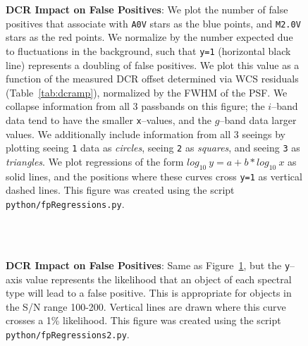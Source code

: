 \documentclass[prd, nofootinbib, floatfix, 11pt, tightenlines, times]{article}
\def\figdir{../figures}
\begin{document}
\begin{figure}[!ht]
  \centering
   \\
   \\
  \caption{{\bf DCR Impact on False Positives}: We plot the number of
    false positives that associate with {\tt A0V} stars as the blue
    points, and {\tt M2.0V} stars as the red points.  We normalize by
    the number expected due to fluctuations in the background, such
    that {\tt y=1} (horizontal black line) represents a doubling of
    false positives.  We plot this value as a function of the measured
    DCR offset determined via WCS residuals (Table~\ref{tab:dcramp}),
    normalized by the FWHM of the PSF.  We collapse information from
    all 3 passbands on this figure; the $i$--band data tend to have
    the smaller {\tt x}--values, and the $g$--band data larger values.
    We additionally include information from all 3 seeings by plotting
    seeing {\tt 1} data as {\it circles}, seeing {\tt 2} as {\it
      squares}, and seeing {\tt 3} as {\it triangles}.  We plot
    regressions of the form $log_{10}~y = a + b * log_{10}~x$ as solid
    lines, and the positions where these curves cross {\tt y=1} as
    vertical dashed lines.  This figure was created using the script
    {\tt python/fpRegressions.py}.}
  \label{fig:fpregress}
\end{figure}

\begin{figure}[!ht]
  \centering
   \\
   \\
  \caption{{\bf DCR Impact on False Positives}: Same as
    Figure~\ref{fig:fpregress}, but the {\tt y}--axis value represents
    the likelihood that an object of each spectral type will lead to a
    false positive.  This is appropriate for objects in the S/N range
    100-200.  Vertical lines are drawn where this curve crosses a 1\%
    likelihood.  This figure was created using the script {\tt
      python/fpRegressions2.py}.}
  \label{fig:fpregress2}
\end{figure}
\end{document}
